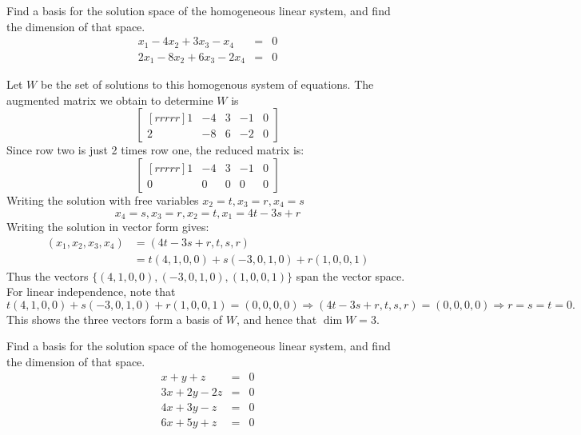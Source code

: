 \ii Find a basis for the solution space of the homogeneous linear system, and find the dimension of that space.
\begin{eqnarray*}
x_1-4x_2+3x_3-x_4 &=& 0\\
2x_1 - 8x_2 +6x_3 -2x_4 &=&0
\end{eqnarray*}
\begin{solution}
\noindent Let $W$ be the set of solutions to this homogenous system of equations. The augmented matrix we obtain to determine $W$ is 
$$
\begin{bmatrix}[rrrrr]
1&-4&3&-1&0\\
2&-8&6&-2&0
\end{bmatrix}
$$
Since row two is just 2 times row one, the reduced matrix is:
$$
\begin{bmatrix}[rrrrr]
1&-4&3&-1&0\\
0&0&0&0&0
\end{bmatrix}
$$
Writing the solution with free variables $x_2= t,x_3=r,x_4=s$
$$
x_4 = s, x_3 = r, x_2 = t, x_1 = 4t-3s+r
$$
Writing the solution in vector form gives:
\begin{align*}
(x_1,x_2,x_3,x_4) &= (4t-3s+r,t,s,r)\tag{$*$}\\
&= t(4,1,0,0) + s(-3,0,1,0) + r(1,0,0,1)\tag{$**$}
\end{align*}
Thus the vectors $\{(4,1,0,0),(-3,0,1,0),(1,0,0,1)\}$ span the vector space. For linear independence, note that 
\[
t(4,1,0,0) + s(-3,0,1,0) + r(1,0,0,1)=(0,0,0,0)\Rightarrow (4t-3s+r,t,s,r)=(0,0,0,0)\Rightarrow r=s=t=0.
\]
This shows the three vectors form a basis of $W$, and hence that $\dim W=3$. 
\end{solution}
\ii Find a basis for the solution space of the homogeneous linear system, and find the dimension of that space.
\begin{eqnarray*}
x+y+z&=& 0\\
3x+2y-2z&=&0\\
4x+3y-z &=& 0\\
6x+5y+z &=& 0
\end{eqnarray*}
